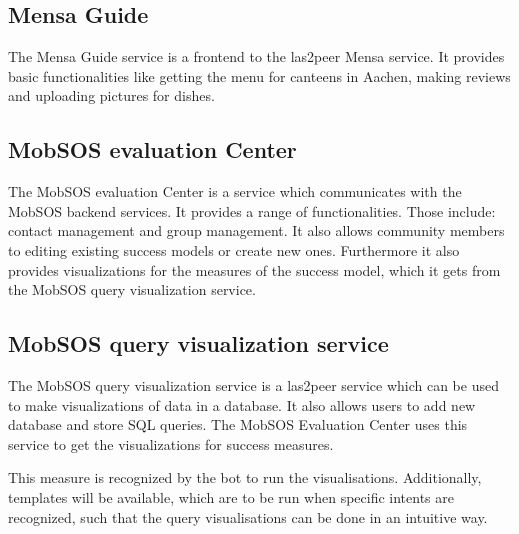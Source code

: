 \subsection{Mensa Guide}
The Mensa Guide service is a frontend to the las2peer Mensa service. It provides basic functionalities like getting the menu for canteens in Aachen, making reviews and uploading pictures for dishes.  

\subsection{MobSOS evaluation Center}
The MobSOS evaluation Center is a service which communicates with the MobSOS backend services. It provides a range of functionalities. Those include: contact management and group management. 
It also allows community members to editing existing success models or create new ones.
Furthermore it also provides visualizations for the measures of the success model, which it gets from the MobSOS query visualization service.

\subsection{MobSOS query visualization service}
The MobSOS query visualization service is a las2peer service which can be used to make visualizations of data in a database. It also allows users to add new database and store SQL queries. The MobSOS Evaluation Center uses this service to get the visualizations for success measures.






This measure is recognized by the bot to run the visualisations. Additionally, templates will be available, which are to be run when specific intents are recognized, such that the query visualisations can be done in an intuitive way.





